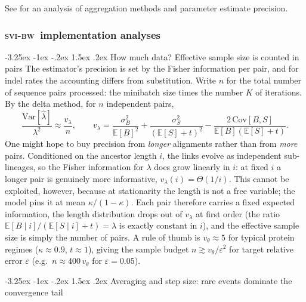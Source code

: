 \documentclass[11pt]{article}
\makeatletter
\renewcommand\paragraph{\@startsection{paragraph}{4}{\z@}%
  {-3.25ex \@plus -1ex \@minus -.2ex}%
  {1.5ex \@plus .2ex}%
  {\normalfont\normalsize\bfseries}}
\newcommand{\E}{\mathbb{E}}
\newcommand{\ins}{\lambda}
\newcommand{\svibw}{\textsc{svi-bw}}
\makeatother
\begin{document}
See  for an analysis of aggregation methods and parameter estimate precision.

\subsubsection{\svibw\ implementation analyses}
\label{appendix:svibw_appendix}

\paragraph{How much data? Effective sample size is counted in pairs}
The estimator's precision is set by the Fisher information per pair,
and for indel rates the accounting differs from substitution.
Write $n$ for the total number of sequence pairs processed: the
minibatch size times the number $K$ of iterations. By the delta method,
for $n$ independent pairs,
\begin{equation}
\label{eq:relvar}
\frac{\mathrm{Var}[\hat\ins]}{\ins^2}\approx\frac{v_\ins}{n},\qquad
v_\ins=\frac{\sigma_B^2}{\E[B]^2}+\frac{\sigma_S^2}{(\E[S]+t)^2}
        -\frac{2\,\mathrm{Cov}[B,S]}{\E[B](\E[S]+t)} .
\end{equation}
One might hope to buy precision from \emph{longer} alignments rather than
from \emph{more} pairs. Conditioned on the ancestor length $i$, the links
evolve as independent sub-lineages, so the Fisher information for $\ins$
does grow linearly in $i$: at fixed $i$ a longer pair is genuinely more
informative, $v_\ins(i)=\Theta(1/i)$. This cannot be exploited, however,
because at stationarity the length is not a free variable; the model pins
it at mean $\kappa/(1{-}\kappa)$. Each pair therefore carries a fixed
expected information, the length distribution drops out of $v_\ins$ at
first order (the ratio $\E[B\mid i]/(\E[S\mid i]{+}t)=\ins$ is exactly
constant in $i$), and the effective sample size is simply the number of
pairs. A
rule of thumb is $v_\theta\approx 5$ for typical protein regimes
($\kappa\approx0.9$, $t\approx1$), giving the sample budget
$n\gtrsim v_\theta/\varepsilon^2$ for target relative error
$\varepsilon$ (e.g.\ $n\approx400\,v_\theta$ for $\varepsilon{=}0.05$).

\paragraph{Averaging and step size: rare events dominate the convergence tail}
\label{sub:averaging}
\end{document}
